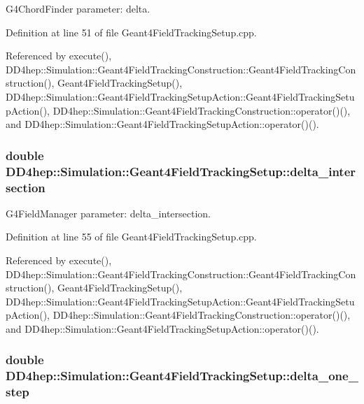 G4ChordFinder parameter: delta. 

Definition at line 51 of file Geant4FieldTrackingSetup.cpp.

Referenced by execute(), DD4hep::Simulation::Geant4FieldTrackingConstruction::Geant4FieldTrackingConstruction(), Geant4FieldTrackingSetup(), DD4hep::Simulation::Geant4FieldTrackingSetupAction::Geant4FieldTrackingSetupAction(), DD4hep::Simulation::Geant4FieldTrackingConstruction::operator()(), and DD4hep::Simulation::Geant4FieldTrackingSetupAction::operator()().\hypertarget{struct_d_d4hep_1_1_simulation_1_1_geant4_field_tracking_setup_ad0e9178802e02034db7130dc778d1fc7}{
\subsubsection[{delta\_\-intersection}]{\setlength{\rightskip}{0pt plus 5cm}double {\bf DD4hep::Simulation::Geant4FieldTrackingSetup::delta\_\-intersection}}}
\label{struct_d_d4hep_1_1_simulation_1_1_geant4_field_tracking_setup_ad0e9178802e02034db7130dc778d1fc7}


G4FieldManager parameter: delta\_\-intersection. 

Definition at line 55 of file Geant4FieldTrackingSetup.cpp.

Referenced by execute(), DD4hep::Simulation::Geant4FieldTrackingConstruction::Geant4FieldTrackingConstruction(), Geant4FieldTrackingSetup(), DD4hep::Simulation::Geant4FieldTrackingSetupAction::Geant4FieldTrackingSetupAction(), DD4hep::Simulation::Geant4FieldTrackingConstruction::operator()(), and DD4hep::Simulation::Geant4FieldTrackingSetupAction::operator()().\hypertarget{struct_d_d4hep_1_1_simulation_1_1_geant4_field_tracking_setup_a7cc063c19cc28d0226234c6cb5e9b10e}{
\subsubsection[{delta\_\-one\_\-step}]{\setlength{\rightskip}{0pt plus 5cm}double {\bf DD4hep::Simulation::Geant4FieldTrackingSetup::delta\_\-one\_\-step}}}
\label{struct_d_d4hep_1_1_simulation_1_1_geant4_field_tracking_setup_a7cc063c19cc28d0226234c6cb5e9b10e}



